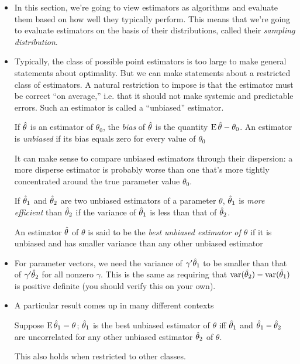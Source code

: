 \begin{itemize}

\item In this section, we're going to view estimators as algorithms
  and evaluate them based on how well they typically perform.  This
  means that we're going to evaluate estimators on the basis of their
  distributions, called their \emph{sampling distribution}.  

\item Typically, the class of possible point estimators is too large
  to make general statements about optimality.  But we can make
  statements about a restricted class of estimators.  A natural
  restriction to impose is that the estimator must be correct ``on
  average,'' i.e. that it should not make systemic and predictable
  errors.  Such an estimator is called a ``unbiased'' estimator.

  \begin{defn}
    If $\hat{\theta}$ is an estimator of $\theta_0$, the \emph{bias} of $\hat{\theta}$ is the
    quantity $\operatorname{E} \hat{\theta} - \theta_0$.  An estimator is \emph{unbiased} if its
    bias equals zero for every value of $\theta_0$
  \end{defn}

  It can make sense to compare unbiased estimators through their
  dispersion: a more disperse estimator is probably worse than one
  that's more tightly concentrated around the true parameter value
  $\theta_0$.

  \begin{defn}
    If $\hat{\theta}_1$ and $\hat{\theta}_2$ are two unbiased estimators of a parameter
    $\theta$, $\hat{\theta}_1$ is \emph{more efficient} than $\hat{\theta}_2$ if the variance
    of $\hat{\theta}_1$ is less than that of $\hat{\theta}_2$.
  \end{defn}

  An estimator $\hat{\theta}$ of $\theta$ is said to be the \emph{best unbiased
  estimator of $\theta$} if it is unbiased and has smaller variance than
  any other unbiased estimator

\item For parameter vectors, we need the variance of $\gamma'\hat{\theta}_1$ to be
  smaller than that of $\gamma'\hat{\theta}_2$ for all nonzero $\gamma$.  This is the same
  as requiring that $\operatorname{var}(\hat{\theta}_2) - \operatorname{var}(\hat{\theta}_1)$ is positive definite
  (you should verify this on your own).

\item A particular result comes up in many different contexts
  \begin{thm}
    Suppose $\operatorname{E} \hat{\theta}_1 = \theta$; $\hat{\theta}_1$ is the best unbiased estimator of
    $\theta$ iff $\hat{\theta}_1$ and $\hat{\theta}_1 - \hat{\theta}_2$ are uncorrelated for any other
    unbiased estimator $\hat{\theta}_2$ of $\theta$.
  \end{thm}
  This also holds when restricted to other classes.


\end{itemize}

